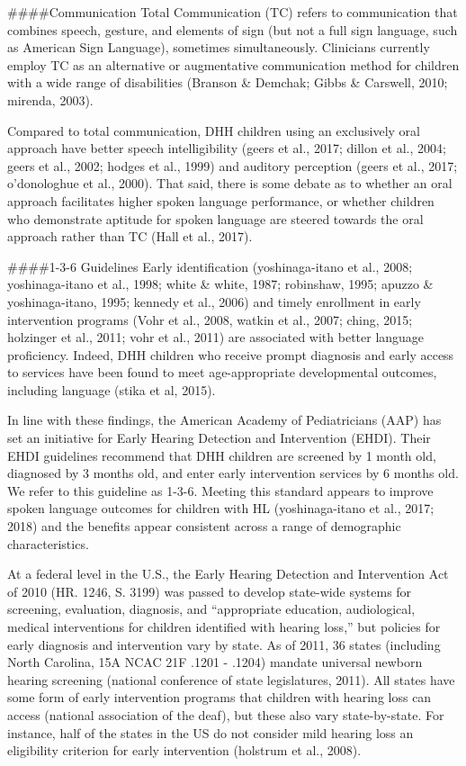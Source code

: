 \documentclass[
]{article}
\begin{document}
\#\#\#\#Communication Total Communication (TC) refers to communication
that combines speech, gesture, and elements of sign (but not a full sign
language, such as American Sign Language), sometimes simultaneously.
Clinicians currently employ TC as an alternative or augmentative
communication method for children with a wide range of disabilities
(Branson \& Demchak; Gibbs \& Carswell, 2010; mirenda, 2003).

Compared to total communication, DHH children using an exclusively oral
approach have better speech intelligibility (geers et al., 2017; dillon
et al., 2004; geers et al., 2002; hodges et al., 1999) and auditory
perception (geers et al., 2017; o'donologhue et al., 2000). That said,
there is some debate as to whether an oral approach facilitates higher
spoken language performance, or whether children who demonstrate
aptitude for spoken language are steered towards the oral approach
rather than TC (Hall et al., 2017).

\#\#\#\#1-3-6 Guidelines Early identification (yoshinaga-itano et al.,
2008; yoshinaga-itano et al., 1998; white \& white, 1987; robinshaw,
1995; apuzzo \& yoshinaga-itano, 1995; kennedy et al., 2006) and timely
enrollment in early intervention programs (Vohr et al., 2008, watkin et
al., 2007; ching, 2015; holzinger et al., 2011; vohr et al., 2011) are
associated with better language proficiency. Indeed, DHH children who
receive prompt diagnosis and early access to services have been found to
meet age-appropriate developmental outcomes, including language (stika
et al, 2015).

In line with these findings, the American Academy of Pediatricians (AAP)
has set an initiative for Early Hearing Detection and Intervention
(EHDI). Their EHDI guidelines recommend that DHH children are screened
by 1 month old, diagnosed by 3 months old, and enter early intervention
services by 6 months old. We refer to this guideline as 1-3-6. Meeting
this standard appears to improve spoken language outcomes for children
with HL (yoshinaga-itano et al., 2017; 2018) and the benefits appear
consistent across a range of demographic characteristics.

At a federal level in the U.S., the Early Hearing Detection and
Intervention Act of 2010 (HR. 1246, S. 3199) was passed to develop
state-wide systems for screening, evaluation, diagnosis, and
``appropriate education, audiological, medical interventions for
children identified with hearing loss,'' but policies for early
diagnosis and intervention vary by state. As of 2011, 36 states
(including North Carolina, 15A NCAC 21F .1201 - .1204) mandate universal
newborn hearing screening (national conference of state legislatures,
2011). All states have some form of early intervention programs that
children with hearing loss can access (national association of the
deaf), but these also vary state-by-state. For instance, half of the
states in the US do not consider mild hearing loss an eligibility
criterion for early intervention (holstrum et al., 2008).
\end{document}
